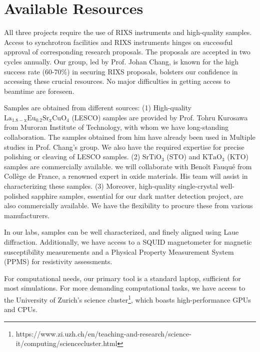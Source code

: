 \documentclass[11pt]{article}
\begin{document}
\section{Available Resources}
All three projects require the use of RIXS instruments and high-quality samples. Access to synchrotron facilities and RIXS instruments hinges on successful approval of corresponding research proposals. The proposals are accepted in two cycles annually. Our group, led by Prof. Johan Chang, is known for the high success rate (60-70\%) in securing RIXS proposals, bolsters our confidence in accessing these crucial resources. No major difficulties in getting access to beamtime are foreseen. 

Samples are obtained from different sources: (1) High-quality $\mathrm{La_{1.8-x}Eu_{0.2}Sr_xCuO_{4}}$ (LESCO) samples are provided by Prof. Tohru Kurosawa from Muroran Institute of Technology, with whom we have long-standing collaboration. The samples obtained from him have already been used in Multiple studies\cite{choi2022unveiling,wang_charge_2021} in Prof. Chang's group. We also have the required expertise for precise polishing or cleaving of LESCO samples. (2) $\mathrm{SrTiO_{3}}$ (STO) and $\mathrm{KTaO_{3}}$ (KTO) samples are commercially available. we will collaborate with Benoît Fauqué from Collège de France, a renowned expert in oxide materials. His team will assist in characterizing these samples. (3) Moreover, high-quality single-crystal well-polished sapphire samples, essential for our dark matter detection project, are also commercially available. We have the flexibility to procure these from various manufacturers. 

In our labs, samples can be well characterized, and finely aligned using Laue diffraction. Additionally, we have access to a SQUID magnetometer for magnetic susceptibility measurements and a Physical Property Measurement System (PPMS) for resistivity assessments.

For computational needs, our primary tool is a standard laptop, sufficient for most simulations. For more demanding computational tasks, we have access to the University of Zurich's science cluster\footnote{https://www.zi.uzh.ch/en/teaching-and-research/science-it/computing/sciencecluster.html}, which boasts high-performance GPUs and CPUs.


\end{document}
